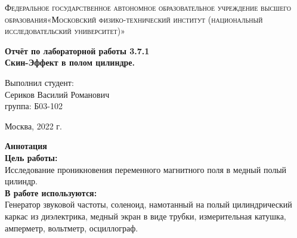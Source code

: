 \documentclass[a4paper, 12pt]{article}%
\begin{document}
	\begin{titlepage}
		\begin{center}
			\textsc{Федеральное государственное автономное образовательное учреждение высшего образования«Московский физико-технический институт (национальный исследовательский университет)»\\[5mm]
			}
			
			\vfill
			
			\textbf{Отчёт по лабораторной работы 3.7.1\\[3mm]
				Скин-Эффект в полом цилиндре.
				\\[50mm]
			}
			
		\end{center}
		
		\hfill
		\begin{minipage}{.5\textwidth}
			Выполнил студент:\\[2mm]
			Сериков Василий Романович\\[2mm]
			группа: Б03-102\\[5mm]
			
		\end{minipage}
		\vfill
		\begin{center}
			Москва, 2022 г.
		\end{center}
		
	\end{titlepage}
	
	\newpage
	\textbf{Аннотация}\\
	
	
	\textbf{Цель работы: }\\
	Исследование проникновения переменного магнитного поля в медный полый цилиндр.\\
	
	\textbf{В работе используются: }\\
	 Генератор звуковой частоты, соленоид, намотанный на полый цилиндрический каркас из диэлектрика, медный экран
	в виде трубки, измерительная катушка, амперметр, вольтметр, осциллограф.\\
	
\end{document}
